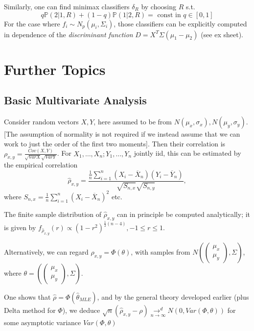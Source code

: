 \documentclass[a4paper]{article}
\begin{document}
Similarly, one can find minimax classifiers $\delta_{R}$ by choosing $R$ s.t. 
\[
	q \mathbb{P}\left( 2|1,R \right) + (1-q)\mathbb{P}\left( 1|2,R \right) = \text{ const in } q \in [0,1]
\] 
For the case where $f_i \sim N_p(\mu_i, \Sigma_i)$, those classifiers can be explicitly computed in dependence of the \textit{discriminant function} $D = X^{T} \Sigma (\mu_1 - \mu_2)$ (see ex sheet).

\section{Further Topics}

\subsection{Basic Multivariate Analysis}

Consider random vectors $X, Y$, here assumed to be from $N(\mu_x, \sigma_x), N(\mu_y, \sigma_y)$. [The assumption of normality is not required if we instead assume that we can work to just the order of the first two moments]. Then their correlation is $\rho_{x,y} = \frac{Cov(X,Y)}{\sqrt{VarX}\sqrt{VarY}}$. For $X_1, \ldots, X_n;Y_1,\ldots,Y_n$ jointly iid, this can be estimated by the empirical correlation
\[
	\hat{\rho}_{x,y} = \frac{\frac{1}{n}\sum_{i=1}^{n} (X_i - \overline{X}_n)(Y_i - \overline{Y}_n)}{\sqrt{S_{n,x}} \sqrt{S_{n,y}} }
,\] where $S_{n,x} = \frac{1}{n} \sum_{i=1}^{n}(X_i - \overline{X}_n)^2$ etc. 

The finite sample distribution of $\hat{\rho}_{x,y}$ can in principle be computed analytically; it is given by $f_{\hat{\rho}_{x,y}}(r) \propto (1-r^2)^{\frac{1}{2}(n-4)}, -1\le r\le 1 $.

Alternatively, we can regard $\rho_{x,y} = \Phi(\theta)$, with samples from $N\left(\begin{pmatrix} \mu_{x} \\ \mu_y \end{pmatrix}, \Sigma\right) $, where $\theta = \left( \begin{pmatrix} \mu_x \\ \mu_y \end{pmatrix}, \Sigma  \right) $. 

One shows that $\hat{\rho} = \Phi(\hat{\theta}_{MLE})$, and by the general theory developed earlier (plus Delta method for $\Phi $), we deduce $\sqrt{n} (\hat{\rho}_{x,y} - \rho) \underset{n\to \infty}{\to ^{d}} N(0, Var(\Phi, \theta))$ for some asymptotic variance $Var(\Phi, \theta)$
\end{document}
